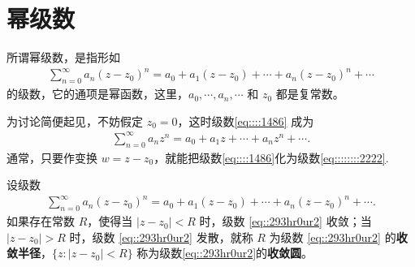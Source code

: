 \documentclass[../../main.tex]{subfiles}%
\begin{document}
\section{幂级数}

\begin{definition}
所谓幂级数，是指形如
\begin{align}
\sum_{n=0}^{\infty} a_n(z - z_0)^n = a_0 + a_1(z - z_0) + \cdots  + a_n(z - z_0)^n + \cdots \label{eq::::1486}
\end{align}
的级数，它的通项是幂函数，这里，\( a_0, \cdots, a_n, \cdots \) 和 \( z_0 \) 都是复常数。
\end{definition}
\begin{remark}
为讨论简便起见，不妨假定 \( z_0 = 0 \)，这时级数\eqref{eq::::1486} 成为
\begin{align}
\sum_{n=0}^{\infty} a_n z^n = a_0 + a_1 z + \cdots + a_n z^n + \cdots. \label{eq::::::::2222}
\end{align}
通常，只要作变换 \( w = z - z_0 \)，就能把级数\eqref{eq::::1486}化为级数\eqref{eq::::::::2222}.
\end{remark}

\begin{definition}
设级数
\begin{align}\label{eq::293hr0ur2}
\sum_{n=0}^{\infty} a_n(z - z_0)^n = a_0 + a_1(z - z_0) + \cdots  + a_n(z - z_0)^n + \cdots . 
\end{align}
如果存在常数 \( R \)，使得当 \( |z-z_0| < R \) 时，级数 \eqref{eq::293hr0ur2}
收敛；当 \( |z-z_0| > R \) 时，级数
\eqref{eq::293hr0ur2}
发散，就称 \( R \) 为级数 \eqref{eq::293hr0ur2} 的\textbf{收敛半径}，\( \{z : |z-z_0| < R\} \) 称为级数\eqref{eq::293hr0ur2}的\textbf{收敛圆}。
\end{definition}
\end{document}
